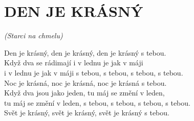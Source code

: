 \section*{\Huge DEN JE KRÁSNÝ}
\emph{(Starci na chmelu)}

Den je krásný, den je krásný, den je krásný s tebou.\\

Když dva se rádimají i v lednu je jak v máji\\
 i v lednu je jak v máji s tebou, s tebou, s tebou, s tebou.\\

Noc je krásná, noc je krásná, noc je krásná s tebou.\\
Když dva jsou jako jeden, tu máj se změní v leden,\\
tu máj se změní v leden, s tebou, s tebou, s tebou, s tebou.\\

Svět je krásný, svět je krásný, svět je krásný s tebou.

\newpage
